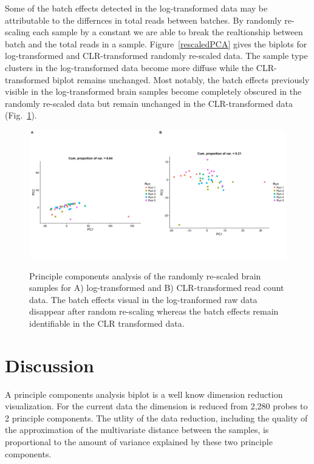 \documentclass{article}\usepackage[]{graphicx}\usepackage[]{color}
\theoremstyle{definition}
\begin{document}
Some of the batch effects detected in the log-transformed data may be attributable to the differnces in total reads between batches.  By randomly re-scaling each sample by a constant we are able to break the realtionship between batch and the total reads in a sample. Figure~\ref{rescaledPCA} gives the biplots for log-transformed and CLR-transformed randomly re-scaled data.  The sample type clusters in the log-transformed data become more diffuse while the CLR-transformed biplot remains unchanged.  Most notably, the batch effects previously visible in the log-transformed brain samples become completely obscured in the randomly re-scaled data but remain unchanged in the CLR-transformed data (Fig.~\ref{rescaledPCAbrain}).  

\begin{figure}
\includegraphics[scale=0.4]{./Figures/IO_PCA_Brain_logRaw_CLR_perturbed}
\label{rescaledPCAbrain}
\caption{Principle components analysis of the randomly re-scaled brain samples for A) log-transformed and B) CLR-transformed read count data.  The batch effects visual in the log-tranformed raw data disappear after random re-scaling whereas the batch effects remain identifiable in the CLR transformed data.}
\end{figure}

\FloatBarrier
\section{Discussion}



A principle components analysis biplot is a well know dimension reduction visualization.  For the current data the dimension is reduced from 2,280 probes to 2 principle components.  The utlity of the data reduction, including the quality of the approximation of the multivariate distance between the samples, is proportional to the amount of variance explained by these two principle components.  


\newpage
\printbibliography
\end{document}
